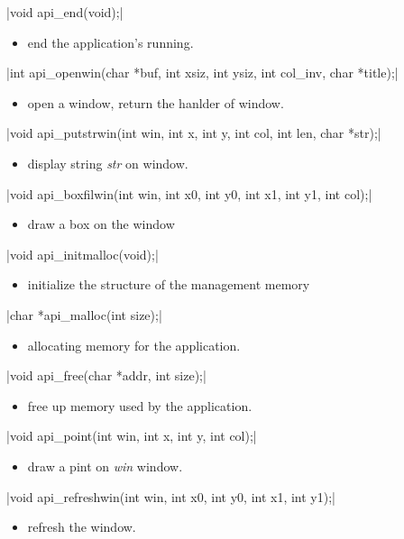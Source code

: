 \documentclass{swfcthesis}
\begin{document}
\csingle|void api_end(void);|
\begin{itemize}
\item end the application's running.
\end{itemize}

\csingle|int api_openwin(char *buf, int xsiz, int ysiz, int col_inv, char *title);|
\begin{itemize}
\item open a window, return the hanlder of window.
\end{itemize}

\csingle|void api_putstrwin(int win, int x, int y, int col, int len, char *str);|
\begin{itemize}
\item display string \emph{str} on window. 
\end{itemize}

\csingle|void api_boxfilwin(int win, int x0, int y0, int x1, int y1, int col);|
\begin{itemize}
\item draw a box on the window
\end{itemize}

\csingle|void api_initmalloc(void);|
\begin{itemize}
\item initialize the structure of the management memory
\end{itemize}

\csingle|char *api_malloc(int size);|
\begin{itemize}
\item allocating memory for the application.
\end{itemize}

\csingle|void api_free(char *addr, int size);|
\begin{itemize}
\item free up memory used by the application.
\end{itemize}

\csingle|void api_point(int win, int x, int y, int col);|
\begin{itemize}
\item draw a pint on \emph{win} window.
\end{itemize}

\csingle|void api_refreshwin(int win, int x0, int y0, int x1, int y1);|
\begin{itemize}
\item refresh the window.
\end{itemize}
\end{document}
